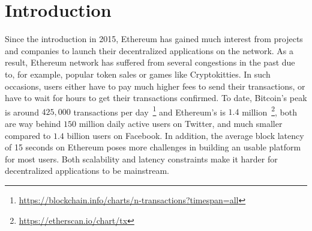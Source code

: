 \section{Introduction}
\label{sec:intro}

Since the introduction in 2015, Ethereum has gained much interest from projects and companies to launch their decentralized applications on the network. As a result, Ethereum network has suffered from several congestions in the past due to, for example, popular token sales or games like Cryptokitties. In such occasions, users either have to pay much higher fees to send their transactions, or have to wait for hours to get their transactions confirmed. To date, Bitcoin’s peak is around $425,000$ transactions per day~\footnote{\url{https://blockchain.info/charts/n-transactions?timespan=all}} and Ethereum's is $1.4$ million~\footnote{\url{https://etherscan.io/chart/tx}}, both are way behind $150$ million daily active users on Twitter, and much smaller compared to $1.4$ billion users on Facebook. In addition, the average block latency of 15 seconds on Ethereum poses more challenges in building an usable platform for most users. Both scalability and latency constraints make it harder for decentralized applications to be mainstream.

